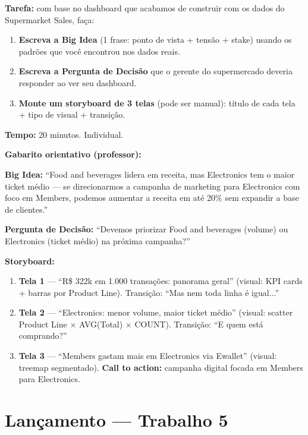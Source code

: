 \begin{SolvedBox}
\textbf{Tarefa:} com base no dashboard que acabamos de construir com os dados
do Supermarket Sales, faça:

\begin{enumerate}
  \item \textbf{Escreva a Big Idea} (1 frase: ponto de vista + tensão + stake)
  usando os padrões que você encontrou nos dados reais.
  \item \textbf{Escreva a Pergunta de Decisão} que o gerente do supermercado
  deveria responder ao ver seu dashboard.
  \item \textbf{Monte um storyboard de 3 telas} (pode ser manual):
  título de cada tela + tipo de visual + transição.
\end{enumerate}
\textbf{Tempo:} 20 minutos. Individual.
\end{SolvedBox}

\begin{SolvedBox}
\textbf{Gabarito orientativo (professor):}

\textbf{Big Idea:} ``Food and beverages lidera em receita, mas Electronics
tem o maior ticket médio — se direcionarmos a campanha de marketing para
Electronics com foco em Members, podemos aumentar a receita em até 20\%
sem expandir a base de clientes.''

\textbf{Pergunta de Decisão:} ``Devemos priorizar Food and beverages (volume)
ou Electronics (ticket médio) na próxima campanha?''

\textbf{Storyboard:}
\begin{enumerate}
  \item \textbf{Tela 1} — ``R\$ 322k em 1.000 transações: panorama geral''
  (visual: KPI cards + barras por Product Line). Transição: ``Mas nem toda
  linha é igual...''
  \item \textbf{Tela 2} — ``Electronics: menor volume, maior ticket médio''
  (visual: scatter Product Line × AVG(Total) × COUNT). Transição: ``E quem
  está comprando?''
  \item \textbf{Tela 3} — ``Members gastam mais em Electronics via Ewallet''
  (visual: treemap segmentado). \textbf{Call to action:} campanha digital
  focada em Members para Electronics.
\end{enumerate}
\end{SolvedBox}

\section{Lançamento — Trabalho 5}

